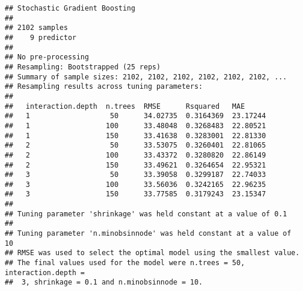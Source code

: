 \documentclass[
]{article}
\newenvironment{Shaded}{\begin{snugshade}}{\end{snugshade}}
\newcommand{\AttributeTok}[1]{\textcolor[rgb]{0.77,0.63,0.00}{#1}}
\newcommand{\ConstantTok}[1]{\textcolor[rgb]{0.00,0.00,0.00}{#1}}
\newcommand{\FloatTok}[1]{\textcolor[rgb]{0.00,0.00,0.81}{#1}}
\newcommand{\FunctionTok}[1]{\textcolor[rgb]{0.00,0.00,0.00}{#1}}
\newcommand{\NormalTok}[1]{#1}
\newcommand{\OtherTok}[1]{\textcolor[rgb]{0.56,0.35,0.01}{#1}}
\newcommand{\SpecialCharTok}[1]{\textcolor[rgb]{0.00,0.00,0.00}{#1}}
\newcommand{\StringTok}[1]{\textcolor[rgb]{0.31,0.60,0.02}{#1}}
\begin{document}
\begin{Shaded}
\end{Shaded}

\begin{verbatim}
## Stochastic Gradient Boosting 
## 
## 2102 samples
##    9 predictor
## 
## No pre-processing
## Resampling: Bootstrapped (25 reps) 
## Summary of sample sizes: 2102, 2102, 2102, 2102, 2102, 2102, ... 
## Resampling results across tuning parameters:
## 
##   interaction.depth  n.trees  RMSE      Rsquared   MAE     
##   1                   50      34.02735  0.3164369  23.17244
##   1                  100      33.48048  0.3268483  22.80521
##   1                  150      33.41638  0.3283001  22.81330
##   2                   50      33.53075  0.3260401  22.81065
##   2                  100      33.43372  0.3280820  22.86149
##   2                  150      33.49621  0.3264654  22.95321
##   3                   50      33.39058  0.3299187  22.74033
##   3                  100      33.56036  0.3242165  22.96235
##   3                  150      33.77585  0.3179243  23.15347
## 
## Tuning parameter 'shrinkage' was held constant at a value of 0.1
## 
## Tuning parameter 'n.minobsinnode' was held constant at a value of 10
## RMSE was used to select the optimal model using the smallest value.
## The final values used for the model were n.trees = 50, interaction.depth =
##  3, shrinkage = 0.1 and n.minobsinnode = 10.
\end{verbatim}
\end{document}
